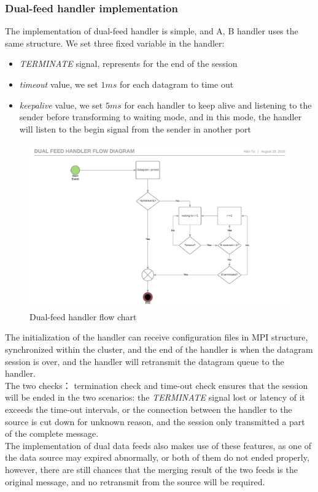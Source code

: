 \documentclass[11pt,openright,a4paper]{report}
\begin{document}
\subsubsection{Dual-feed handler implementation}
The implementation of dual-feed handler is simple, and A, B handler uses the same structure. We set three fixed variable in the handler: 
\begin{itemize}
	\item \textit{TERMINATE} signal, represents for the end of the session
	\item \textit{timeout} value, we set $1ms$ for each datagram to time out
	\item \textit{keepalive} value, we set $5ms$ for each handler to keep alive and listening to the sender before transforming to waiting mode, and in this mode, the handler will listen to the begin signal from the sender in another port
\end{itemize}
\begin{figure}[H]
\centering
\includegraphics[width=0.7\linewidth]{"picture/Dual feed handler flow diagram - Page 1"}
\caption{Dual-feed handler flow chart}
\label{fig:Dualfeedhandlerflowdiagram-Page1}
\end{figure}

The initialization of the handler can receive configuration files in MPI structure, synchronized within the cluster, and the end of the handler is when the datagram session is over, and the handler will retransmit the datagram queue to the handler.\\
The two checks： termination check and time-out check ensures that the session will be ended in the two scenarios: the \textit{TERMINATE} signal lost or latency of it exceeds the time-out intervals, or the connection between the handler to the source is cut down for unknown reason, and the session only transmitted a part of the complete message.\\
The implementation of dual data feeds also makes use of these features, as one of the data source may expired abnormally, or both of them do not ended properly, however, there are still chances that the merging result of the two feeds is the original message, and no retransmit from the source will be required.\\
\end{document}

